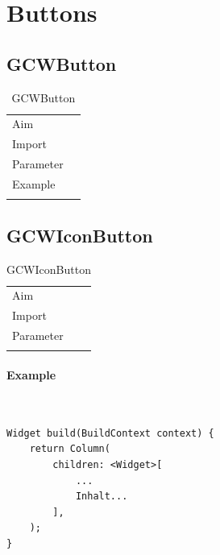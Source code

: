 \newpage
\section{Buttons}
\subsection{GCWButton}
\label{fig: GCWButton}
\begin{table}[H]
\begin{tabular}[h]{p{2cm}p{9cm}}
    \caption{GCWButton}
    Aim       & \\
    Import    & \\
    Parameter & \\
    Example   & \\
    \label{tab:GCWButton}
\end{tabular}
\end{table}

\newpage
\subsection{GCWIconButton}
\label{fig: GWCIconButton}
\begin{table}[H]
\begin{tabular}[h]{p{2cm}p{9cm}}
    \caption{GCWIconButton}
    Aim       & \\
    Import    & \\
    Parameter & \\
    \label{tab:GCWIconButton}
\end{tabular}
\end{table}
\paragraph*{Example} \,
\begin{lstlisting}
Widget build(BuildContext context) {
    return Column(
        children: <Widget>[
            ...
            Inhalt...
        ],
    );
}
\end{lstlisting}
\label{fig: ExampleGCWIconButton}

